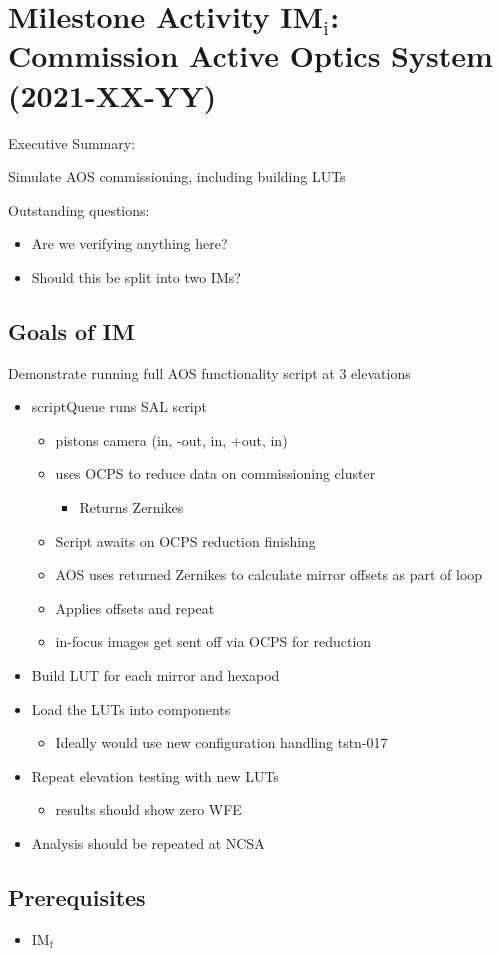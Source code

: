 \section{Milestone Activity IM\(_{\text{i}}\): Commission Active Optics System     (2021-XX-YY)}
\label{sec:orgacbb624}
Executive Summary:

Simulate AOS commissioning, including building LUTs

Outstanding questions:
\begin{itemize}
\item Are we verifying anything here?
\item Should this be split into two IMs?
\end{itemize}

\subsection{Goals of IM}
Demonstrate running full AOS functionality script at 3 elevations
\begin{itemize}
\item scriptQueue runs SAL script
  \begin{itemize}
  \item pistons camera (in, -out, in, +out, in)
  \item uses \gls{OCPS} to reduce data on commissioning cluster
    \begin{itemize}
    \item Returns Zernikes
    \end{itemize}
  \item Script awaits on \gls{OCPS} reduction finishing
  \item AOS uses returned Zernikes to calculate mirror offsets as part of loop
  \item Applies offsets and repeat
  \item in-focus images get sent off via \gls{OCPS} for reduction
  \end{itemize}
\end{itemize}
\begin{itemize}
\item Build LUT for each mirror and hexapod
\item Load the LUTs into components
  \begin{itemize}
  \item Ideally would use new configuration handling tstn-017
  \end{itemize}
\item Repeat elevation testing with new LUTs
  \begin{itemize}
  \item results should show zero WFE
  \end{itemize}
\item Analysis should be repeated at NCSA
\end{itemize}

\subsection{Prerequisites}
\begin{itemize}
\item IM\(_{\text{f}}\)
\end{itemize}
